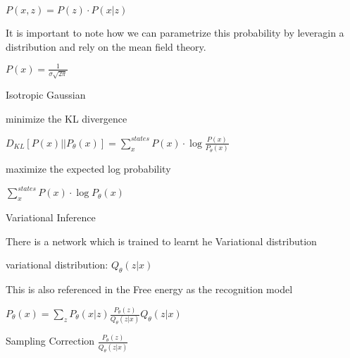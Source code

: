 \documentclass{amsart}
\begin{document}
$P(x,z) = P(z) \cdot P(x|z) $

It is important to note how we can parametrize this probability by leveragin a distribution and rely on the mean field theory.

$P(x) = \frac{1}{\sigma\sqrt{2\pi}}$



Isotropic Gaussian

minimize the KL divergence

$D_{KL}[P(x) || P_{\theta}(x)] = \sum\limits_{x}^{states}P(x)\cdot \log\frac{P(x)}{P_{\theta}(x)}$

maximize the expected log probability

$\sum\limits_{x}^{states}P(x)\cdot \log P_{\theta}(x) $



Variational Inference

There is a network which is trained to learnt he Variational distribution

variational distribution: $Q_{\theta}(z|x)$

This is also referenced in the Free energy as the recognition model

$P_{\theta}(x) = \sum\limits_{z}P_{\theta}(x|z)\frac{P_{\theta}(z)}{Q_{\theta}(z|x)}Q_{\theta}(z|x) $

Sampling Correction $\frac{P_{\theta}(z)}{Q_{\theta}(z|x)}$



\clearpage




\end{document}
